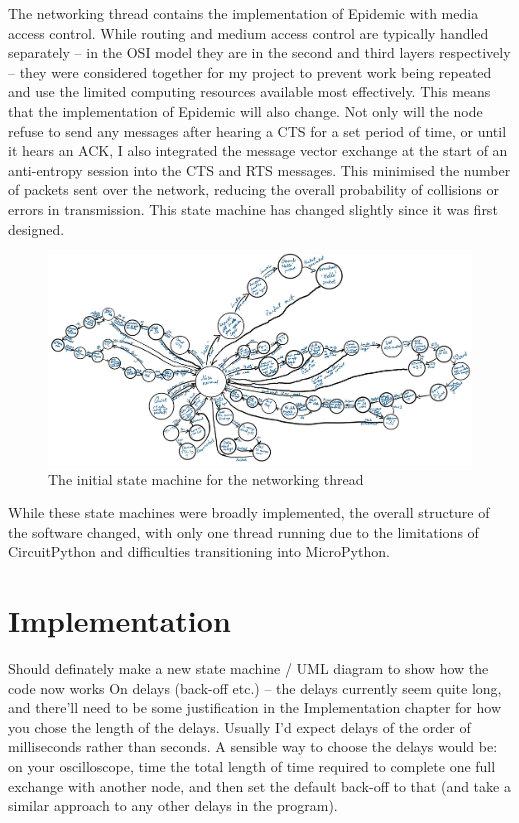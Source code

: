 \documentclass[12pt,a4paper]{report}
\newcommand{\newchapter}[2]{
    \setcounter{chapter}{#1}
    \setcounter{section}{0}
    \chapter*{#2}
    \addcontentsline{toc}{chapter}{#1 #2}
}
\begin{document}
\FloatBarrier
The networking thread contains the implementation of Epidemic with media access control. While routing and medium access control are typically handled separately -- in the OSI model they are in the second and third layers respectively -- they were considered together for my project to prevent work being repeated and use the limited computing resources available most effectively. This means that the implementation of Epidemic will also change. Not only will the node refuse to send any messages after hearing a CTS for a set period of time, or until it hears an ACK, I also integrated the message vector exchange at the start of an anti-entropy session into the CTS and RTS messages. This minimised the number of packets sent over the network, reducing the overall probability of collisions or errors in transmission. This state machine has changed slightly since it was first designed. 
\begin{figure}[h]
\begin{center}
\caption{The initial state machine for the networking thread}
\includegraphics[scale=0.5]{net.jpg}
\end{center}
\end{figure}
\FloatBarrier
While these state machines were broadly implemented, the overall structure of the software changed, with only one thread running due to the limitations of CircuitPython and difficulties transitioning into MicroPython.





\newchapter{3}{Implementation}
Should definately make a new state machine / UML diagram to show how the code now works 
 On delays (back-off etc.) -- the delays currently seem quite long, and there'll need to be some justification in the Implementation chapter for how you chose the length of the delays. Usually I'd expect delays of the order of milliseconds rather than seconds. A sensible way to choose the delays would be: on your oscilloscope, time the total length of time required to complete one full exchange with another node, and then set the default back-off to that (and take a similar approach to any other delays in the program).
\end{document}
